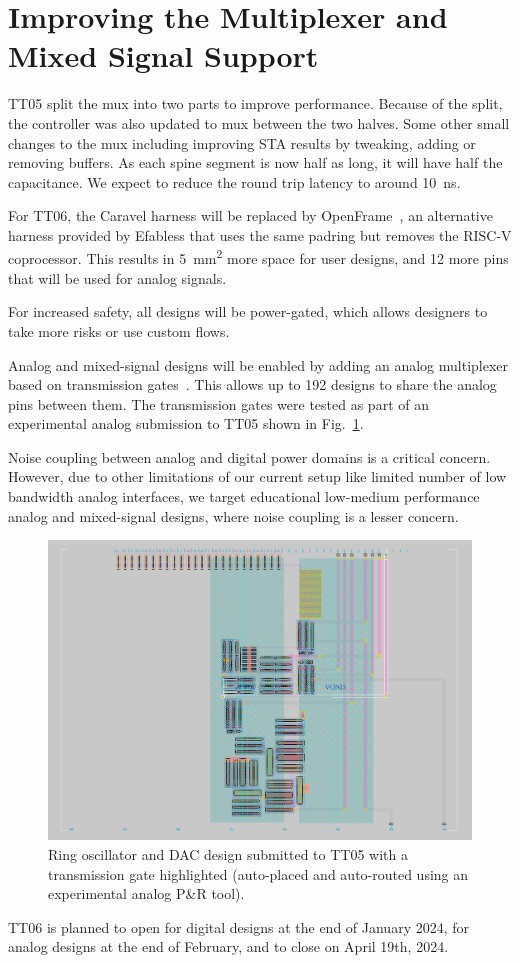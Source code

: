 \section{Improving the Multiplexer and Mixed Signal Support}
\label{sec:improving}

TT05 split the mux into two parts to improve performance. Because of the split, the controller was also updated to mux between the two halves.
Some other small changes to the mux including improving STA results by tweaking, adding or removing buffers.
As each spine segment is now half as long, it will have half the capacitance. 
We expect to reduce the round trip latency to around \qty{10}{\ns}.

For TT06, the Caravel harness will be replaced by OpenFrame~\cite{openframe}, an alternative harness provided by Efabless that uses the same padring but removes the RISC-V coprocessor.
This results in \qty{5}{\mm\squared} more space for user designs, and 12 more pins that will be used for analog signals.

For increased safety, all designs will be power-gated, which allows designers to take more risks or use custom flows.

Analog and mixed-signal designs will be enabled by adding an analog multiplexer based on transmission gates~\cite{transmissiongates}. 
This allows up to 192 designs to share the analog pins between them.
The transmission gates were tested as part of an experimental analog submission to TT05 shown in Fig.~\ref{fig:transmission_gate_TT05}.

Noise coupling between analog and digital power domains is a critical concern. However, due to other limitations of our current setup like limited number of low bandwidth analog interfaces, we target educational low-medium performance analog and mixed-signal designs, where noise coupling is a lesser concern.

\begin{figure}[!t]
\centering
\includegraphics[width=\columnwidth]{./Figs/tt05_transmission_gate.png}
\caption{Ring oscillator and DAC design submitted to TT05 with a transmission gate highlighted (auto-placed and auto-routed using an experimental analog P\&R tool).}
\label{fig:transmission_gate_TT05}
\end{figure}

TT06 is planned to open for digital designs at the end of January 2024, for analog designs at the end of February, and to close on April 19th, 2024.
